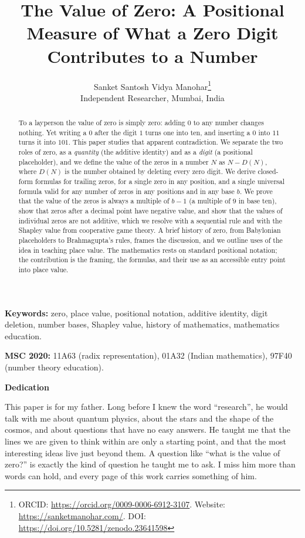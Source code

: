 \documentclass[11pt,a4paper]{article}
\title{The Value of Zero: A Positional Measure of What a Zero Digit Contributes to a Number}
\author{%
  Sanket Santosh Vidya Manohar\thanks{ORCID: \url{https://orcid.org/0009-0006-6912-3107}. Website: \url{https://sanketmanohar.com/}. DOI: \url{https://doi.org/10.5281/zenodo.23641598}}\\[2pt]
  \small Independent Researcher, Mumbai, India
}
\date{} %
\theoremstyle{definition}
\newcommand{\Dz}{D}   %
\begin{document}
\maketitle

\begin{abstract}
To a layperson the value of zero is simply zero: adding $0$ to any number changes nothing. Yet writing a $0$ after the digit $1$ turns one into ten, and inserting a $0$ into $11$ turns it into $101$. This paper studies that apparent contradiction. We separate the two roles of zero, as a \emph{quantity} (the additive identity) and as a \emph{digit} (a positional placeholder), and we define the value of the zeros in a number $N$ as $N-\Dz(N)$, where $\Dz(N)$ is the number obtained by deleting every zero digit. We derive closed-form formulas for trailing zeros, for a single zero in any position, and a single universal formula valid for any number of zeros in any positions and in any base $b$. We prove that the value of the zeros is always a multiple of $b-1$ (a multiple of $9$ in base ten), show that zeros after a decimal point have negative value, and show that the values of individual zeros are not additive, which we resolve with a sequential rule and with the Shapley value from cooperative game theory. A brief history of zero, from Babylonian placeholders to Brahmagupta's rules, frames the discussion, and we outline uses of the idea in teaching place value. The mathematics rests on standard positional notation; the contribution is the framing, the formulas, and their use as an accessible entry point into place value.
\end{abstract}

\noindent\textbf{Keywords:} zero, place value, positional notation, additive identity, digit deletion, number bases, Shapley value, history of mathematics, mathematics education.

\noindent\textbf{MSC 2020:} 11A63 (radix representation), 01A32 (Indian mathematics), 97F40 (number theory education).

\begin{center}
\begin{minipage}{0.85\textwidth}
\small\itshape
\begin{center}\upshape\bfseries Dedication\end{center}
This paper is for my father. Long before I knew the word ``research'', he would talk with me about quantum physics, about the stars and the shape of the cosmos, and about questions that have no easy answers. He taught me that the lines we are given to think within are only a starting point, and that the most interesting ideas live just beyond them. A question like ``what is the value of zero?'' is exactly the kind of question he taught me to ask. I miss him more than words can hold, and every page of this work carries something of him.
\end{minipage}
\end{center}
\end{document}
